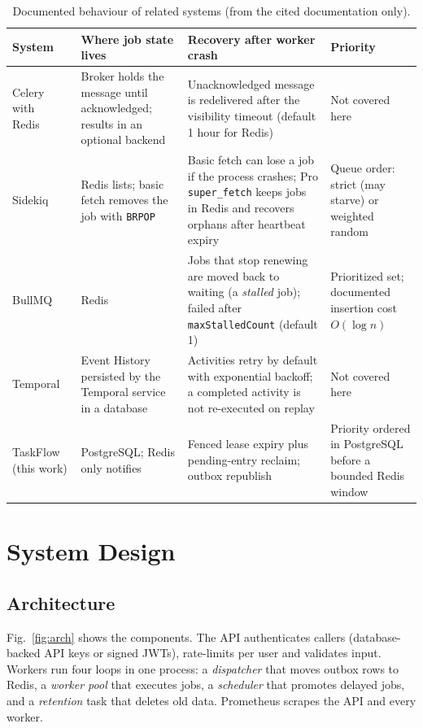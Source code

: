 \documentclass[conference]{IEEEtran}
\newcommand{\code}[1]{\texttt{\small #1}}
\begin{document}
\begin{table}[t]
\caption{Documented behaviour of related systems (from the cited documentation only).}
\label{tab:related}
\centering
\small
\begin{tabular}{p{1.9cm}p{4.3cm}p{4.6cm}p{4.6cm}}
\toprule
System & Where job state lives & Recovery after worker crash & Priority \\
\midrule
Celery with Redis~\cite{celeryredis,celeryoptimizing} & Broker holds the message until acknowledged; results in an optional backend & Unacknowledged message is redelivered after the visibility timeout (default 1 hour for Redis) & Not covered here \\
Sidekiq~\cite{sidekiqreliability} & Redis lists; basic fetch removes the job with \code{BRPOP} & Basic fetch can lose a job if the process crashes; Pro \code{super\_fetch} keeps jobs in Redis and recovers orphans after heartbeat expiry & Queue order: strict (may starve) or weighted random \\
BullMQ~\cite{bullmqstalled,bullmqprio} & Redis & Jobs that stop renewing are moved back to waiting (a \emph{stalled} job); failed after \code{maxStalledCount} (default 1) & Prioritized set; documented insertion cost $O(\log n)$ \\
Temporal~\cite{temporalhistory,temporalactivity} & Event History persisted by the Temporal service in a database & Activities retry by default with exponential backoff; a completed activity is not re-executed on replay & Not covered here \\
TaskFlow (this work) & PostgreSQL; Redis only notifies & Fenced lease expiry plus pending-entry reclaim; outbox republish & Priority ordered in PostgreSQL before a bounded Redis window \\
\bottomrule
\end{tabular}
\end{table}

\section{System Design}
\label{sec:design}

\subsection{Architecture}
Fig.~\ref{fig:arch} shows the components. The API authenticates callers (database-backed API keys or signed JWTs), rate-limits per user and validates input. Workers run four loops in one process: a \emph{dispatcher} that moves outbox rows to Redis, a \emph{worker pool} that executes jobs, a \emph{scheduler} that promotes delayed jobs, and a \emph{retention} task that deletes old data. Prometheus scrapes the API and every worker.
\end{document}
